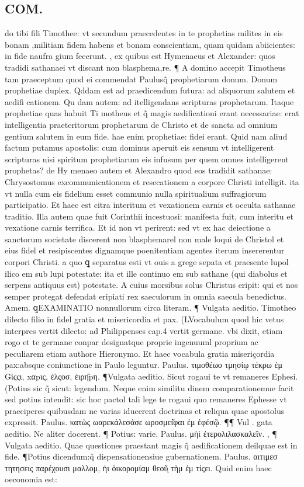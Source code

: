 \documentclass{article}
\begin{document}
\begin{pages}
\section*{COM. }
\marginpar{[ p.1 ]}\pstart do tibi fili Timothee: vt secundum praecedentes in te prophetias milites in eis bonam ,militiam fidem habens et bonam conscientiam, quam quidam abiicientes: in fide naufra gium fecerunt. , ex quibus est Hymenaeus et Alexander: quos tradidi sathanaei vt discant non blasphema,re. ¶ A domino accepit Timotheus tam praeceptum quod ei commendat Paulusq̃ prophetiarum donum. Donum prophetiae duplex. Qddam est ad praedicendum futura: ad aliquorum salutem et aedifi cationem. Qu dam autem: ad itelligendans scripturas prophetarum. Itaque prophetiae quas habuit Ti motheus et q̃ magis aedificationi erant necessariae: erat intelligentia praeteritorum prophetarum de Christo et de sancta ad omnium gentium salutem in eum fide. hae enim prophetiae: fidei erant. Quid nam aliud factum putamus apostolis: cum dominus aperuit eis sensum vt intelligerent scripturas nisi spiritum prophetiarum eis infusum per quem omnes intelligerent prophetas? de Hy menaeo autem et Alexandro quod eos tradidit sathanae: Chrysostomus excommunicationem et resecationem a corpore Christi intelligit. ita vt nulla cum eis fidelium esset communio nulla spiritualium suffragiorum participatio. Et haec est citra interitum et vexationem carnis et occulta sathanae traditio. Illa autem quae fuit Corinthii incestuosi: manifesta fuit, cum interitu et vexatione carnis terrifica. Et id non vt perirent: sed vt ex hac deiectione a sanctorum societate discerent non blasphemarel non male loqui de Christol et eius fidel et resipiscentes dignamque poenitentiam agentes iterum insererentur corpori Christi. a quo ꝗ separatus esti vt ouis a grege sepata et praesente lupol ilico em sub lupi potestate: ita et ille continuo em sub sathane (qui diabolus et serpens antiquus est) potestate. A cuius morsibus solus Christus eripit: qui et nos semper protegat defendat eripiati rex saeculorum in omnia saecula benedictus. Amem.  \pend\pstart  ꝗEXAMINATIO nonnullorum circa literam. ¶ Vulgata aeditio. Timotheo dilecto filio in fidel gratia et misericordia et pax. (LVocabulum quod hic vetus interpres vertit dilecto: ad Philippenses cap.4 vertit germane. vbi dixit, etiam rogo et te germane conpar designatque proprie ingenuuml proprium ac peculiarem etiam authore Hieronymo. Et haec vocabula gratia miseriçordia pax:absque coniunctione in Paulo leguntur. Paulus. τιμοθέωο τμησίῳ τέκρω ἐμ Gίςςι, xαpις, ἐλςοσ, ἐιρη̂pη. ¶Vulgata aeditio.  Sicut rogaui te vt remaneres Ephesi. (Potius sic q̃ sicut: legendum. Neque enim similitu dinem comparationemue facit sed potius intendit: sic hoc pactol tali lege te rogaui quo remaneres Ephesse vt praeciperes quibusdam ne varias iducerent doctrinas et reliqua quae apostolus expressit. Paulus. κατὼς ωαρεκάλεσάσε ωροσμεί͂φαι ἐμ ἐφέσῷ. ¶¶ Vul . gata aeditio. Ne aliter docerent. ¶ Potius: varie. Paulus. μὴὶ ἐτερολιλασκαλεῖν. , ¶ Vulgata aeditio. Quae questiones praestant magis q̃ aedificationem deilquae est in fide. ¶Potius dicendum:q̃ dispensationensiue gubernationem. Paulus. αιτιμεσ τητησεις παρέχουσι μαλλομ, ἠι ὀικορομίαμ θεοῦͅ τὴμ ἐμ τίςει. Quid enim haec oeconomia est: 
\end{pages}
\end{document}
